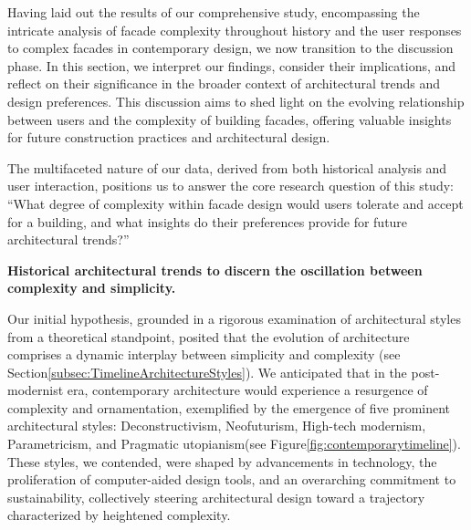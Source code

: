 


Having laid out the results of our comprehensive study, encompassing the intricate analysis of facade complexity throughout history and the user responses to complex facades in contemporary design, we now transition to the discussion phase.
In this section, we interpret our findings, consider their implications, and reflect on their significance in the broader context of architectural trends and design preferences.
This discussion aims to shed light on the evolving relationship between users and the complexity of building facades, offering valuable insights for future construction practices and architectural design.

The multifaceted nature of our data, derived from both historical analysis and user interaction, positions us to answer the core research question of this study: ``What degree of complexity within facade design would users tolerate and accept for a building, and what insights do their preferences provide for future architectural trends?''



\textbf{Historical architectural trends to discern the oscillation between complexity and simplicity.}

Our initial hypothesis, grounded in a rigorous examination of architectural styles from a theoretical standpoint, posited that the evolution of architecture comprises a dynamic interplay between simplicity and complexity (see Section\ref{subsec:TimelineArchitectureStyles}).
We anticipated that in the post-modernist era, contemporary architecture would experience a resurgence of complexity and ornamentation, exemplified by the emergence of five prominent architectural styles: Deconstructivism, Neofuturism, High-tech modernism, Parametricism, and Pragmatic utopianism(see Figure\ref{fig:contemporarytimeline}).
These styles, we contended, were shaped by advancements in technology, the proliferation of computer-aided design tools, and an overarching commitment to sustainability, collectively steering architectural design toward a trajectory characterized by heightened complexity.

